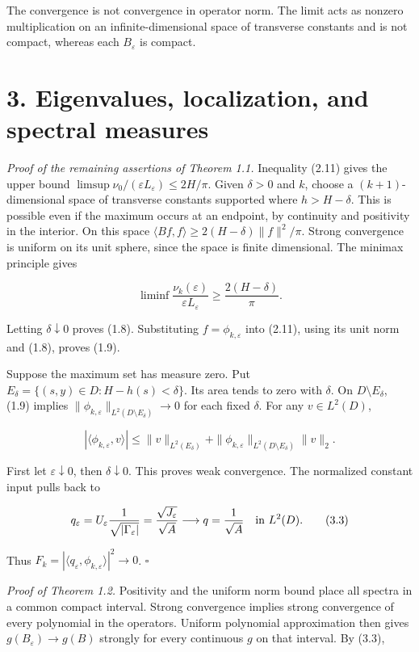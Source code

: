 \documentclass[11pt]{article}
\begin{document}
The convergence is not convergence in operator norm. The limit acts as
nonzero multiplication on an infinite-dimensional space of transverse
constants and is not compact, whereas each \(B_\varepsilon\) is compact.

\section{3. Eigenvalues, localization, and spectral
measures}\label{eigenvalues-localization-and-spectral-measures}

\emph{Proof of the remaining assertions of Theorem 1.1.} Inequality
(2.11) gives the upper bound
\(\limsup\nu_0/(\varepsilon L_\varepsilon)\le2H/\pi\). Given
\(\delta>0\) and \(k\), choose a \((k+1)\)-dimensional space of
transverse constants supported where \(h>H-\delta\). This is possible
even if the maximum occurs at an endpoint, by continuity and positivity
in the interior. On this space
\(\langle Bf,f\rangle\ge2(H-\delta)\|f\|^2/\pi\). Strong convergence is
uniform on its unit sphere, since the space is finite dimensional. The
minimax principle gives

\[
\liminf\frac{\nu_k(\varepsilon)}{\varepsilon L_\varepsilon}
 \ge\frac{2(H-\delta)}\pi.
\tag{3.1}
\]

Letting \(\delta\downarrow0\) proves (1.8). Substituting
\(f=\phi_{k,\varepsilon}\) into (2.11), using its unit norm and (1.8),
proves (1.9).

Suppose the maximum set has measure zero. Put
\(E_\delta=\{(s,y)\in D:H-h(s)<\delta\}\). Its area tends to zero with
\(\delta\). On \(D\setminus E_\delta\), (1.9) implies
\(\|\phi_{k,\varepsilon}\|_{L^2(D\setminus E_\delta)}\to0\) for each
fixed \(\delta\). For any \(v\in L^2(D)\),

\[
|\langle\phi_{k,\varepsilon},v\rangle|
 \le\|v\|_{L^2(E_\delta)}
 +\|\phi_{k,\varepsilon}\|_{L^2(D\setminus E_\delta)}\|v\|_2.
\tag{3.2}
\]

First let \(\varepsilon\downarrow0\), then \(\delta\downarrow0\). This
proves weak convergence. The normalized constant input pulls back to

\[
q_\varepsilon=U_\varepsilon\frac1{\sqrt{|\Gamma_\varepsilon|}}
 =\frac{\sqrt{J_\varepsilon}}{\sqrt A}
 \longrightarrow q=\frac1{\sqrt A}\quad\hbox{in }L^2(D).
\tag{3.3}
\]

Thus \(F_k=|\langle q_\varepsilon,\phi_{k,\varepsilon}\rangle|^2\to0\).
\(\square\)

\emph{Proof of Theorem 1.2.} Positivity and the uniform norm bound place
all spectra in a common compact interval. Strong convergence implies
strong convergence of every polynomial in the operators. Uniform
polynomial approximation then gives \(g(B_\varepsilon)\to g(B)\)
strongly for every continuous \(g\) on that interval. By (3.3),
\end{document}
